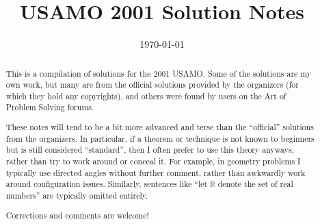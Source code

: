 \documentclass[11pt]{scrartcl}
\title{USAMO 2001 Solution Notes}
\date{\today}
\begin{document}
\maketitle

\begin{abstract}
This is a compilation of solutions
for the 2001 USAMO.
Some of the solutions are my own work,
but many are from the official solutions provided by the organizers
(for which they hold any copyrights),
and others were found by users on the Art of Problem Solving forums.

These notes will tend to be a bit more advanced and terse than the ``official''
solutions from the organizers.
In particular, if a theorem or technique is not known to beginners
but is still considered ``standard'', then I often prefer to
use this theory anyways, rather than try to work around or conceal it.
For example, in geometry problems I typically use directed angles
without further comment, rather than awkwardly work around configuration issues.
Similarly, sentences like ``let $\mathbb{R}$ denote the set of real numbers''
are typically omitted entirely.

Corrections and comments are welcome!
\end{abstract}

\tableofcontents
\newpage

\addtocounter{section}{-1}
\end{document}
